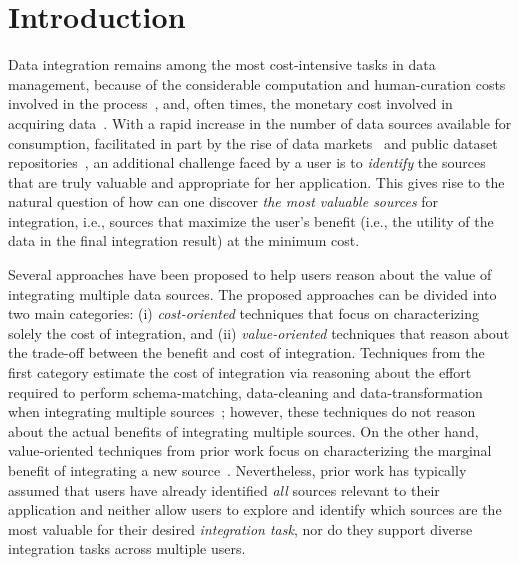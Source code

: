 \documentclass{vldb}
\begin{document}
\section{Introduction}
\label{sec:intro}
Data integration remains among the most cost-intensive tasks in data management, because of the considerable computation and human-curation costs involved in the process~\cite{kruse2015estimating}, and, often times, the monetary cost involved in acquiring data~\cite{balazinska:vldb11}. With a rapid increase in the number of data sources available for consumption, facilitated in part by the rise of data markets~\cite{balazinska:vldb11} and public dataset repositories~\cite{datahub}, an additional challenge faced by a user is to {\em identify} the sources that are truly valuable and appropriate for her application. This gives rise to the natural question of how can one discover {\em the most valuable sources} for integration, i.e., sources that maximize the user's benefit (i.e., the utility of the data in the final integration result) at the minimum cost. 

Several approaches have been proposed to help users reason about the value of integrating multiple data sources. The proposed approaches can be divided into two main categories: (i) {\em cost-oriented} techniques that focus on characterizing solely the cost of integration, and (ii) {\em value-oriented} techniques that reason about the trade-off between the benefit and cost of integration. Techniques from the first category estimate the cost of integration via reasoning about the effort required to perform schema-matching, data-cleaning and data-transformation when integrating multiple sources~\cite{kruse2015estimating, smith:2009}; however, these techniques do not reason about the actual benefits of integrating multiple sources. On the other hand, value-oriented techniques from prior work focus on characterizing the marginal benefit of integrating a new source~\cite{dong:vldb13,rekatsinas:2014}. Nevertheless, prior work has typically assumed that users have already identified {\em all} sources relevant to their application and neither allow users to explore and identify which sources are the most valuable for their desired {\em integration task}, nor do they support diverse integration tasks across multiple users.
\end{document}
